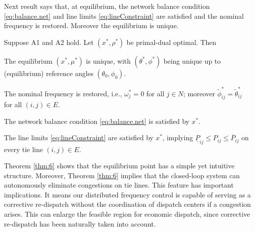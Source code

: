 Next result says that, at equilibrium, the network balance condition \eqref{eq:balance.net} and 
line limits \eqref{eq:lineConstraint} are satisfied and the nominal frequency is
restored.  Moreover the equilibrium is unique.
\begin{theorem}
        \label{thm:6}
        Suppose  A1 and A2 hold.  Let $(x^*, \rho^*)$ be primal-dual optimal. 
        Then
        \bee
        \item The equilibrium
        $(x^*, \mu^*)$ is unique, with $(\theta^*, \phi^*)$ being unique
        up to (equilibrium) reference angles $(\theta_0, \phi_0)$.
        \item The nominal frequency is restored, i.e., $\omega^*_j=0$ for all $j\in N$;
        moreover $\tilde\phi^*_{ij} = \tilde\theta^*_{ij}$ for all $(i,j)\in E$.
        \item The network balance condition \eqref{eq:balance.net} is satisfied by $x^*$.
        \item The line limits \eqref{eq:lineConstraint} are satisfied by $x^*$, implying
        $\underline{P}_{ij} \le P_{ij} \le \overline{P}_{ij}$ on every tie line $(i,j)\in E$.
        \eee 
\end{theorem}
Theorem \ref{thm:6} shows that the equilibrium point has a simple yet intuitive structure. 
Moreover, Theorem \ref{thm:6} implies that the closed-loop system can autonomously 
eliminate congestions on tie lines. This feature has important implications. It means our distributed frequency control is capable of serving as a corrective re-dispatch without the coordination of dispatch centers if a congestion 
arises.   This can enlarge the feasible region for economic dispatch,
since corrective re-dispatch has been naturally taken into account. 

